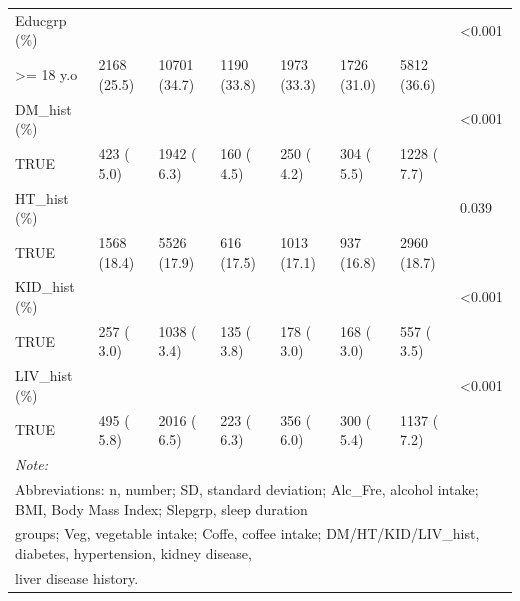 \documentclass[]{tufte-handout}
\begin{document}
\begin{table}[!htbp]
\begin{tabular}[t]{llllllll}
Educgrp (\%) &  &  &  &  &  &  & <0.001\\
\rowcolor{gray!6}  \hspace{1em}>= 18 y.o & 2168 (25.5) & 10701 (34.7) & 1190 (33.8) & 1973 (33.3) & 1726 (31.0) & 5812 (36.6) & \\
DM\_hist (\%) &  &  &  &  &  &  & <0.001\\
\rowcolor{gray!6}  \hspace{1em}TRUE & 423 ( 5.0) & 1942 ( 6.3) & 160 ( 4.5) & 250 ( 4.2) & 304 ( 5.5) & 1228 ( 7.7) & \\
HT\_hist (\%) &  &  &  &  &  &  & 0.039\\
\rowcolor{gray!6}  \hspace{1em}TRUE & 1568 (18.4) & 5526 (17.9) & 616 (17.5) & 1013 (17.1) & 937 (16.8) & 2960 (18.7) & \\
KID\_hist (\%) &  &  &  &  &  &  & <0.001\\
\rowcolor{gray!6}  \hspace{1em}TRUE & 257 ( 3.0) & 1038 ( 3.4) & 135 ( 3.8) & 178 ( 3.0) & 168 ( 3.0) & 557 ( 3.5) & \\
LIV\_hist (\%) &  &  &  &  &  &  & <0.001\\
\rowcolor{gray!6}  \hspace{1em}TRUE & 495 ( 5.8) & 2016 ( 6.5) & 223 ( 6.3) & 356 ( 6.0) & 300 ( 5.4) & 1137 ( 7.2) & \\
\bottomrule
\multicolumn{8}{l}{\textit{Note: }}\\
\multicolumn{8}{l}{Abbreviations: n, number; SD, standard deviation; Alc\_Fre, alcohol intake; BMI, Body Mass Index; Slepgrp, sleep duration}\\
\multicolumn{8}{l}{groups; Veg, vegetable intake; Coffe, coffee intake; DM/HT/KID/LIV\_hist, diabetes, hypertension, kidney disease,}\\
\multicolumn{8}{l}{liver disease history.}\\
\end{tabular}
\end{table}

\newpage
\end{document}
